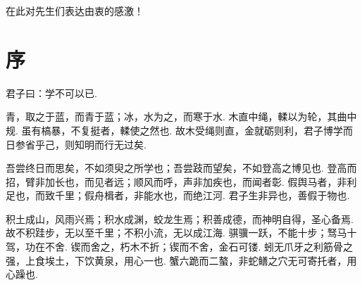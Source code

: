 在此对先生们表达由衷的感激！

\cleardoublepage
\chapter*{序}
君子曰：学不可以已.

青，取之于蓝，而青于蓝；冰，水为之，而寒于水.
木直中绳，輮以为轮，其曲中规.
虽有槁暴，不复挺者，輮使之然也.
故木受绳则直，金就砺则利，君子博学而日参省乎己，则知明而行无过矣.

吾尝终日而思矣，不如须臾之所学也；吾尝跂而望矣，不如登高之博见也.
登高而招，臂非加长也，而见者远；顺风而呼，声非加疾也，而闻者彰.
假舆马者，非利足也，而致千里；假舟楫者，非能水也，而绝江河.
君子生非异也，善假于物也.

积土成山，风雨兴焉；积水成渊，蛟龙生焉；积善成德，而神明自得，圣心备焉.
故不积跬步，无以至千里；不积小流，无以成江海.
骐骥一跃，不能十步；驽马十驾，功在不舍.
锲而舍之，朽木不折；锲而不舍，金石可镂.
蚓无爪牙之利筋骨之强，上食埃土，下饮黄泉，用心一也.
蟹六跪而二螯，非蛇鳝之穴无可寄托者，用心躁也.
